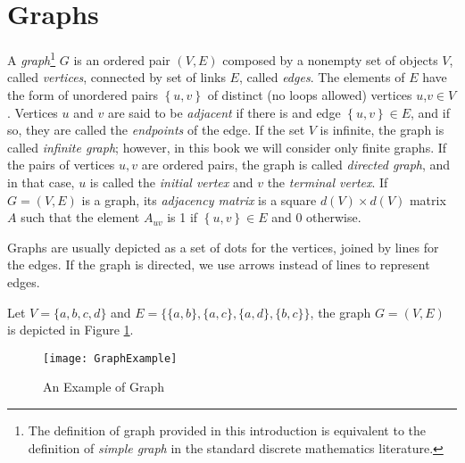 %
%

\section{Graphs}
\label{sec:Graphs}

A \emph{graph}\footnote{The definition of graph provided in this introduction is equivalent to the definition of \emph{simple graph} in the standard discrete mathematics literature.} $G$ is an ordered pair $(V,E)$ composed by a nonempty set of objects $V$, called \emph{vertices}, connected by set of links $E$, called \emph{edges}. The elements of $E$ have the form of unordered pairs $\left\{ u,v\right\}$ of distinct (no loops allowed) vertices $u$,$v\in V$. Vertices $u$ and $v$ are said to be \emph{adjacent} if there is and edge $\left\{ u,v\right\} \in E$, and if so, they are called the \emph{endpoints} of the edge. If the set $V$ is infinite, the graph is called \emph{infinite graph}; however, in this book we will consider only finite graphs. If the pairs of vertices $u, v$ are ordered pairs, the graph is called \emph{directed graph}, and in that case, $u$ is called the \emph{initial vertex} and $v$ the \emph{terminal vertex}. If $G = (V,E)$ is a graph, its \emph{adjacency matrix} is a square $d(V) \times d(V)$ matrix $A$ such that the element $A_{uv}$ is 1 if $\left\{ u,v\right\} \in E$ and 0 otherwise.

Graphs are usually depicted as a set of dots for the vertices, joined by lines for the edges. If the graph is directed, we use arrows instead of lines to represent edges.

\begin{example}
Let $V=\{a, b, c, d\}$ and $E=\{ \{a,b\}, \{a,c\}, \{a,d\}, \{b,c\} \}$, the graph $G=(V,E)$ is depicted in Figure \ref{fig:Graph-Example}.
\end{example}

\begin{figure}[h]
\centering\texttt{[image: GraphExample]}
\caption{\label{fig:Graph-Example}An Example of Graph}
\end{figure}

